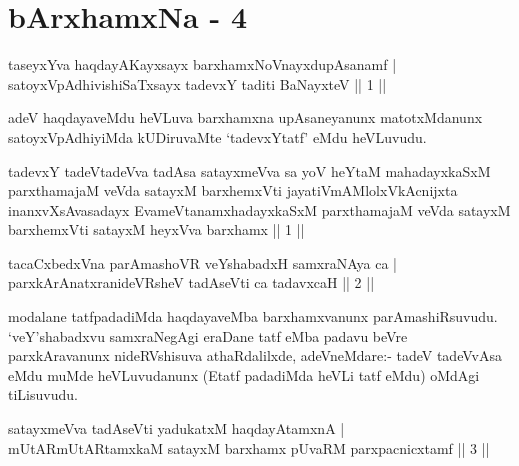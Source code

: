 
\chapter{bArxhamxNa - 4}
\begin{shl}
taseyxYva haqdayAKayxsayx barxhamxNoV\s nayxdupAsanamf | \\
satoyxVpAdhivishiSaTxsayx tadevxY taditi BaNayxteV \hfill ||  1 || 
\end{shl}

\begin{artha}
adeV haqdayaveMdu heVLuva barxhamxna upAsaneyanunx matotxMdanunx satoyxVpAdhiyiMda kUDiruvaMte `tadevxYtatf' eMdu heVLuvudu.
\end{artha}

\begin{shl}
tadevxY tadeVtadeVva tadAsa satayxmeVva sa yoV heYtaM mahadayxkaSxM parxthamajaM veVda satayxM barxhemxVti jayatiVmAMlolxVkAcnijxta inanxvXsAvasadayx EvameVtanamxhadayxkaSxM parxthamajaM veVda satayxM barxhemxVti satayxM heyxVva barxhamx || 1 ||
\end{shl}
\begin{shl}
tacaCxbedxVna parAmashoVR veYshabadxH samxraNAya ca | \\
parxkArAnatxranideVRsheV tadAseVti ca tadavxcaH \hfill ||  2 || 
\end{shl}

\begin{artha}
modalane tatfpadadiMda haqdayaveMba barxhamxvanunx parAmashiRsuvudu. `veY'shabadxvu samxraNegAgi eraDane tatf eMba padavu beVre parxkAravanunx nideRVshisuva athaRdalilxde, adeVneMdare:- tadeV tadeVvA\s sa eMdu muMde heVLuvudanunx (Etatf padadiMda heVLi tatf eMdu) oMdAgi tiLisuvudu.
\end{artha}


\begin{shl}
satayxmeVva tadAseVti yadukatxM haqdayAtamxnA | \\
mUtARmUtARtamxkaM satayxM barxhamx pUvaRM parxpacnicxtamf \hfill ||  3 || 
\end{shl}

